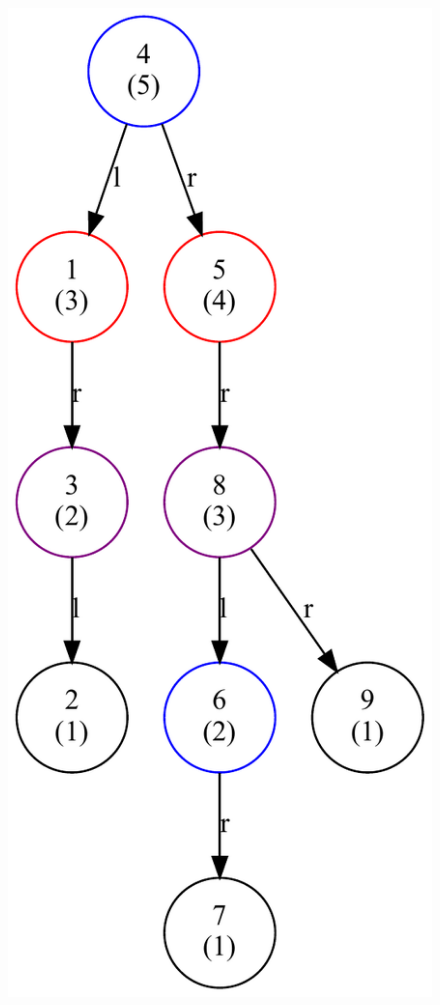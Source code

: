 \begin{figure}[hbt]
{        \includegraphics[scale = 0.32]{img/gv/aufg2_6_FindBT4}\label{fig:splay-findbt4}}
    \qquad
\end{figure}
